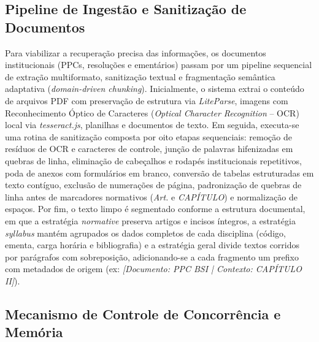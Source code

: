 \documentclass[12pt]{article}
\begin{document}
\FloatBarrier


\subsection{Pipeline de Ingestão e Sanitização de Documentos}

Para viabilizar a recuperação precisa das informações, os documentos institucionais (PPCs, resoluções e ementários) passam por um pipeline sequencial de extração multiformato, sanitização textual e fragmentação semântica adaptativa (\textit{domain-driven chunking}). Inicialmente, o sistema extrai o conteúdo de arquivos PDF com preservação de estrutura via \textit{LiteParse}, imagens com Reconhecimento Óptico de Caracteres (\textit{Optical Character Recognition} -- OCR) local via \textit{tesseract.js}, planilhas e documentos de texto. Em seguida, executa-se uma rotina de sanitização composta por oito etapas sequenciais: remoção de resíduos de OCR e caracteres de controle, junção de palavras hifenizadas em quebras de linha, eliminação de cabeçalhos e rodapés institucionais repetitivos, poda de anexos com formulários em branco, conversão de tabelas estruturadas em texto contíguo, exclusão de numerações de página, padronização de quebras de linha antes de marcadores normativos (\textit{Art.} e \textit{CAPÍTULO}) e normalização de espaços. Por fim, o texto limpo é segmentado conforme a estrutura documental, em que a estratégia \textit{normative} preserva artigos e incisos íntegros, a estratégia \textit{syllabus} mantém agrupados os dados completos de cada disciplina (código, ementa, carga horária e bibliografia) e a estratégia geral divide textos corridos por parágrafos com sobreposição, adicionando-se a cada fragmento um prefixo com metadados de origem (ex: \textit{[Documento: PPC BSI | Contexto: CAPÍTULO II]}).


\subsection{Mecanismo de Controle de Concorrência e Memória}
\end{document}
